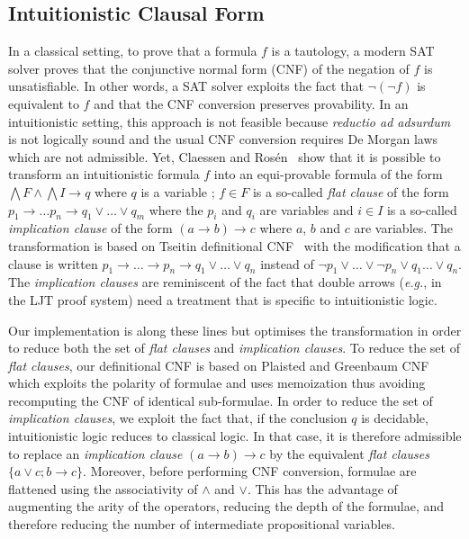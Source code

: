\documentclass[utf8,a4paper,UKenglish,cleveref, autoref, thm-restate]{lipics-v2021}
\begin{document}
\subsection{Intuitionistic Clausal Form}


In a classical setting, to prove that a formula $f$ is a tautology, a modern
SAT solver proves that the conjunctive normal form (CNF) of the
negation of $f$ is unsatisfiable. In other words, a SAT solver
exploits the fact that $\neg (\neg f)$ is equivalent to $f$ and that
the CNF conversion preserves provability.
%
In an intuitionistic setting, this approach is not feasible because
\emph{reductio ad adsurdum} is not logically sound and
the usual CNF conversion requires De Morgan laws which are not admissible.
%
Yet, Claessen and Rosén~\cite{ClaessenR15} show that it is possible to
transform an intuitionistic  formula $f$ into an equi-provable formula of the form
$
  \bigwedge F \land \bigwedge I \to q
$
where $q$ is a variable ; $f \in F$ is a so-called \emph{flat clause} of the
form $p_1 \to \dots p_n \to q_1 \lor \dots \lor q_m$ where the $p_i$
and $q_i$ are variables and $i\in I$ is a so-called \emph{implication clause}
of the form $(a\to b) \to c $ where $a$, $b$ and $c$ are variables.
%
The transformation is based on Tseitin definitional CNF~\cite{Tseitin1983} with the
modification that a clause is written
$p_1 \to \dots \to p_n \to q_1 \lor \dots \lor q_n$ instead of
$\neg p_1 \lor \dots \lor \neg p_n \lor q_1 \dots \lor q_n$.
%
The \emph{implication clauses} are reminiscent of the fact that double
arrows (\emph{e.g.}, in the LJT proof system) need a
treatment that is specific to intuitionistic logic. %

Our implementation is along these lines but optimises the
transformation in order to reduce both the set of \emph{flat clauses}
and \emph{implication clauses}.  To reduce the set of \emph{flat
  clauses}, our definitional CNF is based on Plaisted and Greenbaum
CNF~\cite{PlaistedG86} which exploits the polarity of formulae and uses
memoization thus avoiding recomputing the CNF of identical sub-formulae.
%
In order to reduce the set of \emph{implication clauses}, we exploit
the fact that, if the conclusion $q$ is decidable, intuitionistic logic reduces to
classical logic. In that case, it is therefore
admissible to replace an \emph{implication clause} $(a \to b) \to c$
by the equivalent \emph{flat clauses} $\{a\lor c ; b \to c\}$.
%
Moreover, before performing CNF conversion, formulae are flattened
using the associativity of $\land$ and $\lor$. This has the advantage
of augmenting the arity of the operators, reducing the depth of the
formulae, and therefore reducing the number of intermediate propositional variables.
\end{document}
